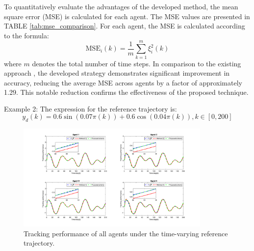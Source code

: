 \documentclass[journal,onecolumn]{IEEEtran}
\begin{document}
\begin{table}[H]
    \centering
    \caption{Mean square error comparison (Example 1)}
    \label{tab:mse_comparison}
\end{table}


To quantitatively evaluate the advantages of the developed method, the mean square error (MSE) is calculated for each agent. The MSE values are presented in TABLE \ref{tab:mse_comparison}. For each agent, the MSE is calculated according to the formula: \[
\text{MSE}_{i}(k) = \frac{1}{m} \sum_{k=1}^{m} \xi^2_{i}(k)
\] where $ m $  denotes the total number of time steps. In comparison to the existing approach \cite{1}, the developed strategy demonstrates significant improvement in accuracy, reducing the average MSE across agents by a factor of approximately 1.29. This notable reduction confirms the effectiveness of the proposed technique.


Example 2: The expression for the reference trajectory is:
\[ y_d(k)=0.6\sin(0.07\pi(k))+0.6\cos(0.04\pi(k)), k \in [0, 200] \]

\begin{figure}[H]
    \centering
    \includegraphics[width=0.85\textwidth]{var_tracking.png}
    \caption{Tracking performance of all agents under the time-varying reference trajectory.}
    \label{fig:tracking_var} %
\end{figure}
\end{document}
